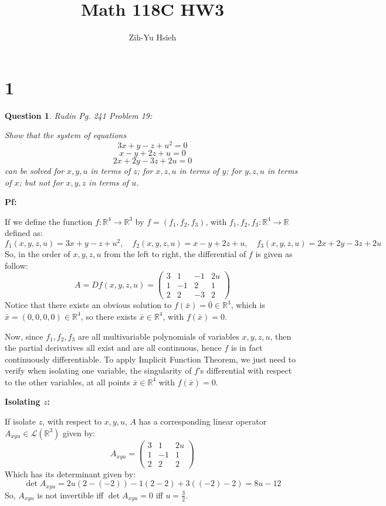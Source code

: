 \documentclass{article}
\title{Math 118C HW3}
\author{Zih-Yu Hsieh}
\newtheorem{question}{Question}
\begin{document}
\maketitle

\section*{1}
\begin{myBox}[]{}
    \begin{question}
        Rudin Pg. 241 Problem 19:

        Show that the system of equations
        $$3x+y-z+u^2=0$$
        $$x-y+2z+u=0$$
        $$2x+2y-3z+2u=0$$
        can be solved for $x,y,u$ in terms of $z$; for $x,z,u$ in terms of $y$; for $y,z,u$ in terms of $x$; but not for $x,y,z$ in terms of $u$.
    \end{question}
\end{myBox}

\textbf{Pf:}

If we define the function $f:\mathbb{R}^4\rightarrow\mathbb{R}^3$ by $f=(f_1,f_2,f_3)$, with $f_1,f_2,f_3:\mathbb{R}^4\rightarrow\mathbb{R}$ defined as:
$$f_1(x,y,z,u)=3x+y-z+u^2,\quad f_2(x,y,z,u)=x-y+2z+u,\quad f_3(x,y,z,u)=2x+2y-3z+2u$$
So, in the order of $x,y,z,u$ from the left to right, the differential of $f$ is given as follow:
$$A=Df(x,y,z,u)=\begin{pmatrix}
    3&1&-1&2u\\
    1&-1&2&1\\
    2&2&-3&2
\end{pmatrix}$$
Notice that there exists an obvious solution to $f(\bar{x})=\bar{0}\in\mathbb{R}^3$, which is $\bar{x}=(0,0,0,0)\in\mathbb{R}^4$, so there exists $\bar{x}\in\mathbb{R}^4$, with $f(\bar{x})=0$.

Now, since $f_1,f_2,f_3$ are all multivariable polynomials of variables $x,y,z,u$, then the partial derivatives all exist and are all continuous, hence $f$ is in fact continuously differentiable. To apply Implicit Function Theorem, we just need to verify when isolating one variable, the singularity of $f$'s differential with respect to the other variables, at all points $\bar{x}\in\mathbb{R}^4$ with $f(\bar{x})=0$.

\hfil

\textbf{Isolating $z$:}

If isolate $z$, with respect to $x,y,u$, $A$ has a corresponding linear operator $A_{xyu}\in\mathcal{L}(\mathbb{R}^3)$ given by:
$$A_{xyu}=\begin{pmatrix}
    3&1&2u\\
    1&-1&1\\
    2&2&2
\end{pmatrix}$$
Which has its determinant given by:
$$\det A_{xyu} = 2u(2-(-2))-1(2-2)+3((-2)-2)=8u-12$$
So, $A_{xyu}$ is not invertible iff $\det A_{xyu}=0$ iff $u=\frac{3}{2}$.
\end{document}

